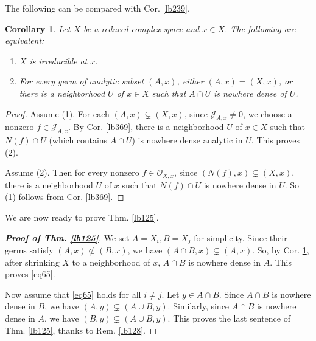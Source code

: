 \documentclass[12pt,b5paper,notitlepage]{report}
\theoremstyle{definition}
\theoremstyle{plain}
\newtheorem{co}[df]{Corollary}
\newcommand{\scr}{\mathscr}
\numberwithin{equation}{section}
\begin{document}
The following can be compared with Cor. \ref{lb239}.

\begin{co}\label{lb177}
Let $X$ be a reduced complex space and $x\in X$. The following are equivalent:
\begin{enumerate}[label=(\arabic*)]
\item $X$ is irreducible at $x$.
\item For every germ of analytic subset $(A,x)$, either $(A,x)=(X,x)$, or there is a neighborhood $U$ of $x\in X$ such that $A\cap U$ is nowhere dense  of $U$. 
\end{enumerate}
\end{co}

\begin{proof}
Assume (1). For each $(A,x)\subsetneq(X,x)$, since $\scr J_{A,x}\neq 0$, we choose a nonzero $f\in\scr J_{A,x}$. By Cor. \ref{lb369}, there is a neighborhood $U$ of $x\in X$ such that $N(f)\cap U$ (which contains $A\cap U$) is nowhere dense analytic in $U$. This proves (2).

Assume (2). Then for every nonzero $f\in\scr O_{X,x}$, since $(N(f),x)\subsetneq(X,x)$, there is a neighborhood $U$ of $x$ such that $N(f)\cap U$ is nowhere dense in $U$. So (1) follows from Cor. \ref{lb369}.
\end{proof}

We are now ready to prove Thm. \ref{lb125}.



\begin{proof}[\textbf{Proof of Thm. \ref{lb125}}]
We set $A=X_i,B=X_j$ for simplicity. Since their germs satisfy $(A,x)\nsubset(B,x)$, we have $(A\cap B,x)\subsetneq (A,x)$. So, by Cor. \ref{lb177}, after shrinking $X$ to a neighborhood of $x$, $A\cap B$ is nowhere dense in $A$. This proves \eqref{eq65}.

Now assume that \eqref{eq65} holds for all $i\neq j$. Let $y\in A\cap B$. Since $A\cap B$ is nowhere dense in $B$, we have  $(A,y)\subsetneq (A\cup B,y)$. Similarly, since $A\cap B$ is nowhere dense in $A$, we have  $(B,y)\subsetneq (A\cup B,y)$. This proves the last sentence of Thm. \ref{lb125}, thanks to Rem. \ref{lb128}.
\end{proof}
\end{document}
